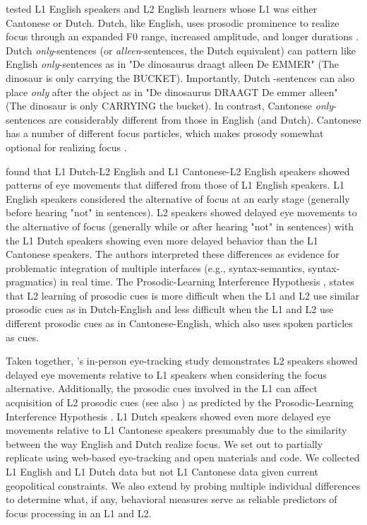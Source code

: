 \cite{Ge2021} tested L1 English speakers and L2 English learners whose L1 was either Cantonese or Dutch. Dutch, like English, uses prosodic prominence to realize focus through an expanded F0 range, increased amplitude, and longer durations \citep{dimitrova2010focus}. Dutch \textit{only}-sentences (or \textit{alleen}-sentences, the Dutch equivalent) can pattern like English \textit{only}-sentences as in "De dinosaurus draagt alleen De EMMER" (The dinosaur is only carrying the BUCKET). Importantly, Dutch -sentences can also place \textit{only} after the object as in "De dinosaurus DRAAGT De emmer alleen" (The dinosaur is only CARRYING the bucket). In contrast, Cantonese \textit{only}-sentences are considerably different from those in English (and Dutch). Cantonese has a number of different focus particles, which makes prosody somewhat optional for realizing focus \citep{lee2019focus, wu2010prosodic, ge2024bilingual, fung2000final}. 

\cite{Ge2021} found that L1 Dutch-L2 English and L1 Cantonese-L2 English speakers showed patterns of eye movements that differed from those of L1 English speakers. L1 English speakers considered the alternative of focus at an early stage (generally before hearing "not" in sentences). L2 speakers showed delayed eye movements to the alternative of focus (generally while or after hearing "not" in sentences) with the L1 Dutch speakers showing even more delayed behavior than the L1 Cantonese speakers. The authors interpreted these differences as evidence for problematic integration of multiple interfaces (e.g., syntax-semantics, syntax-pragmatics) in real time. The Prosodic-Learning Interference Hypothesis \citep{tremblay2016effects, tremblay2021re}, states that L2 learning of prosodic cues is more difficult when the L1 and L2 use similar prosodic cues as in Dutch-English and less difficult when the L1 and L2 use different prosodic cues as in Cantonese-English, which also uses spoken particles as cues. 

Taken together, \cite{Ge2021}'s in-person eye-tracking study demonstrates L2 speakers showed delayed eye movements relative to L1 speakers when considering the focus alternative. Additionally, the prosodic cues involved in the L1 can affect acquisition of L2 prosodic cues (see also \cite{ge2021comprehension}) as predicted by the Prosodic-Learning Interference Hypothesis \citep{tremblay2016effects}. L1 Dutch speakers showed even more delayed eye movements relative to L1 Cantonese speakers presumably due to the similarity between the way English and Dutch realize focus. We set out to partially replicate \cite{Ge2021} using web-based eye-tracking and open materials and code. We collected L1 English and L1 Dutch data but not L1 Cantonese data given current geopolitical constraints. We also extend \cite{Ge2021} by probing multiple individual differences to determine what, if any, behavioral measures serve as reliable predictors of focus processing in an L1 and L2. 

